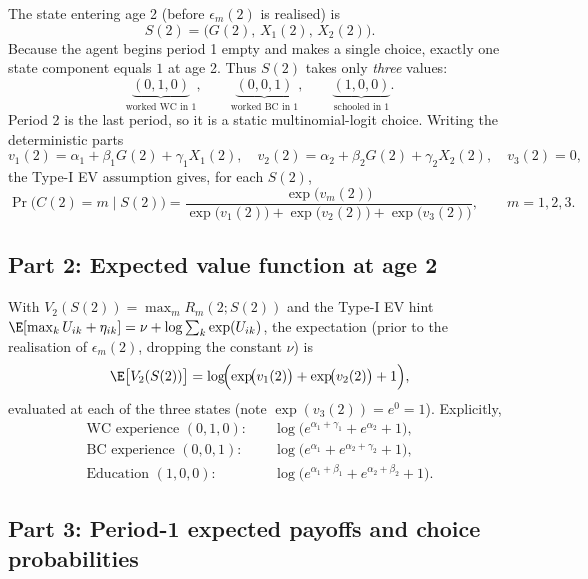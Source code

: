 \documentclass[11pt,english]{article}
\begin{document}
The state entering age 2 (before $\epsilon_m(2)$ is realised) is
\[
S(2)=\bigl(G(2),\,X_1(2),\,X_2(2)\bigr).
\]
Because the agent begins period 1 empty and makes a single choice, exactly one
state component equals $1$ at age 2. Thus $S(2)$ takes only \emph{three} values:
\[
\underbrace{(0,1,0)}_{\text{worked WC in 1}},\qquad
\underbrace{(0,0,1)}_{\text{worked BC in 1}},\qquad
\underbrace{(1,0,0)}_{\text{schooled in 1}}.
\]
Period 2 is the last period, so it is a static multinomial-logit choice. Writing
the deterministic parts
\[
v_{1}(2)=\alpha_1+\beta_1 G(2)+\gamma_1 X_1(2),\quad
v_{2}(2)=\alpha_2+\beta_2 G(2)+\gamma_2 X_2(2),\quad
v_{3}(2)=0,
\]
the Type-I EV assumption gives, for each $S(2)$,
\begin{equation}
\Pr\bigl(C(2)=m\mid S(2)\bigr)=\frac{\exp\!\bigl(v_{m}(2)\bigr)}
{\exp\!\bigl(v_{1}(2)\bigr)+\exp\!\bigl(v_{2}(2)\bigr)+\exp\!\bigl(v_{3}(2)\bigr)},
\qquad m=1,2,3 .
\end{equation}

\subsection*{Part 2: Expected value function at age 2}

With $V_{2}(S(2))=\max_{m}R_{m}(2;S(2))$ and the Type-I EV hint
$\E[\max_k U_{ik}+\eta_{ik}]=\nu+\log\sum_k\exp(U_{ik})$, the expectation
(prior to the realisation of $\epsilon_m(2)$, dropping the constant $\nu$) is
\begin{equation}
\E\bigl[V_{2}(S(2))\bigr]
=\log\!\Bigl(\exp\!\bigl(v_{1}(2)\bigr)+\exp\!\bigl(v_{2}(2)\bigr)+1\Bigr),
\end{equation}
evaluated at each of the three states (note $\exp(v_3(2))=e^0=1$). Explicitly,
\begin{align*}
\text{WC experience }(0,1,0):&\quad \log\!\bigl(e^{\alpha_1+\gamma_1}+e^{\alpha_2}+1\bigr),\\
\text{BC experience }(0,0,1):&\quad \log\!\bigl(e^{\alpha_1}+e^{\alpha_2+\gamma_2}+1\bigr),\\
\text{Education }(1,0,0):&\quad \log\!\bigl(e^{\alpha_1+\beta_1}+e^{\alpha_2+\beta_2}+1\bigr).
\end{align*}

\subsection*{Part 3: Period-1 expected payoffs and choice probabilities}
\end{document}

